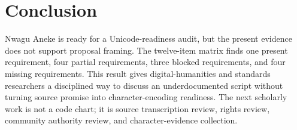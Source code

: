 \documentclass[sigconf,nonacm]{acmart}
\begin{document}
\section{Conclusion}
Nwagu Aneke is ready for a Unicode-readiness audit, but the present evidence
does not support proposal framing. The twelve-item matrix finds one present
requirement, four partial requirements, three blocked requirements, and four
missing requirements. This result gives digital-humanities and standards
researchers a disciplined way to discuss an underdocumented script without
turning source promise into character-encoding readiness. The next scholarly
work is not a code chart; it is source transcription review, rights review,
community authority review, and character-evidence collection.



\end{document}
